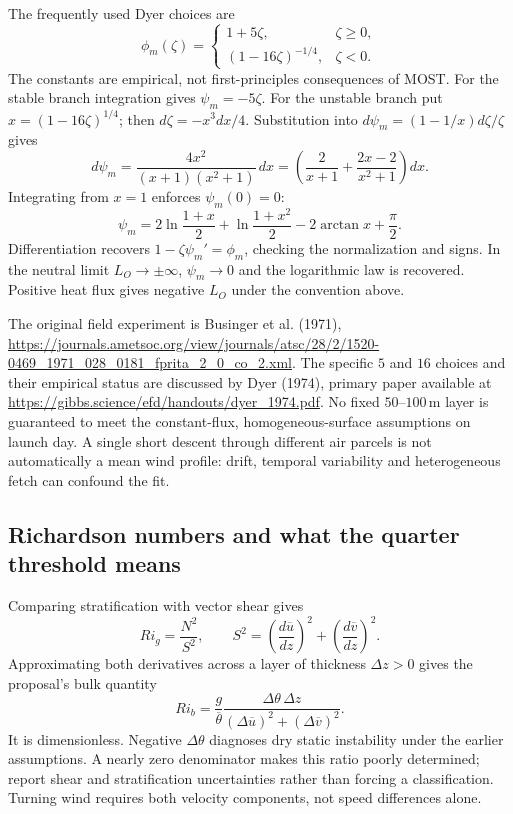 \documentclass[11pt,a4paper]{article}
\numberwithin{equation}{section}
\begin{document}
The frequently used Dyer choices are
\begin{equation}
 \phi_m(\zeta)=
 \begin{cases}
  1+5\zeta,&\zeta\geq0,\\
  (1-16\zeta)^{-1/4},&\zeta<0.
 \end{cases}
\end{equation}
The constants are empirical, not first-principles consequences of MOST.
For the stable branch integration gives $\psi_m=-5\zeta$.
For the unstable branch put $x=(1-16\zeta)^{1/4}$; then
$d\zeta=-x^3dx/4$. Substitution into $d\psi_m=(1-1/x)d\zeta/\zeta$
gives
\begin{equation}
 d\psi_m=\frac{4x^2}{(x+1)(x^2+1)}\,dx
 =\left(\frac{2}{x+1}+\frac{2x-2}{x^2+1}\right)dx.
\end{equation}
Integrating from $x=1$ enforces $\psi_m(0)=0$:
\begin{equation}
 \psi_m=2\ln\frac{1+x}{2}+\ln\frac{1+x^2}{2}
        -2\arctan x+\frac\pi2.
\end{equation}
Differentiation recovers $1-\zeta\psi_m'=\phi_m$, checking the
normalization and signs. In the neutral limit $L_O\to\pm\infty$,
$\psi_m\to0$ and the logarithmic law is recovered. Positive heat flux
gives negative $L_O$ under the convention above.

The original field experiment is Businger et al. (1971),
\url{https://journals.ametsoc.org/view/journals/atsc/28/2/1520-0469_1971_028_0181_fprita_2_0_co_2.xml}.
The specific $5$ and $16$ choices and their empirical status are discussed
by Dyer (1974), primary paper available at
\url{https://gibbs.science/efd/handouts/dyer_1974.pdf}.
No fixed $50$--$100\,\mathrm m$ layer is guaranteed to meet the
constant-flux, homogeneous-surface assumptions on launch day. A single
short descent through different air parcels is not automatically a mean
wind profile: drift, temporal variability and heterogeneous fetch can
confound the fit.

\subsection{Richardson numbers and what the quarter threshold means}

Comparing stratification with vector shear gives
\begin{equation}
 Ri_g=\frac{N^2}{S^2},\qquad
 S^2=\left(\frac{d\overline u}{dz}\right)^2
       +\left(\frac{d\overline v}{dz}\right)^2.
\end{equation}
Approximating both derivatives across a layer of thickness $\Delta z>0$
gives the proposal's bulk quantity
\begin{equation}
 Ri_b=\frac{g}{\overline\theta}
 \frac{\Delta\theta\,\Delta z}
      {(\Delta\overline u)^2+(\Delta\overline v)^2}.
\end{equation}
It is dimensionless. Negative $\Delta\theta$ diagnoses dry static
instability under the earlier assumptions. A nearly zero denominator
makes this ratio poorly determined; report shear and stratification
uncertainties rather than forcing a classification. Turning wind requires
both velocity components, not speed differences alone.
\end{document}
